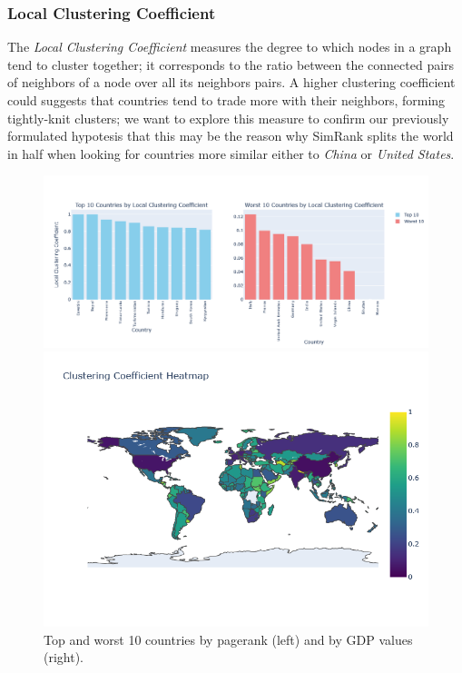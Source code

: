 \documentclass[12pt, a4paper]{article}
\begin{document}
\subsubsection{Local Clustering Coefficient}

The \textit{Local Clustering Coefficient} measures the degree to which nodes in a graph tend to cluster together; it corresponds to the ratio between the connected pairs of neighbors of a node over all its neighbors pairs. A higher clustering coefficient could suggests that countries tend to trade more with their neighbors, forming tightly-knit clusters; we want to explore this measure to confirm our previously formulated hypotesis that this may be the reason why SimRank splits the world in half when looking for countries more similar either to \textit{China} or \textit{United States}.

\begin{figure}[!ht]
\centering
\begin{minipage}[b]{0.49\textwidth}
    \centering
    \includegraphics[width=\textwidth]{figures/question4/figure_12a.png}
\end{minipage}
\hfill
\begin{minipage}[b]{0.49\textwidth}
    \centering
    \includegraphics[width=\textwidth]{figures/question4/figure_12b.png}
\end{minipage}
\captionsetup{font=scriptsize,labelfont=bf}
\caption{Top and worst 10 countries by pagerank (left) and by GDP values (right).}
\label{fig:figure12}
\end{figure}
\end{document}
